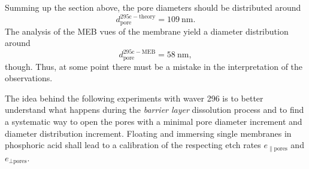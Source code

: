 \documentclass[thesis.tex]{subfiles}
\begin{document}
      Summing up the section above, the pore diameters should be distributed around
      \begin{equation}
          d_\mathrm{pore}^\mathrm{295c-theory} = \SI{109}{\nano\meter}.
      \end{equation}
      The analysis of the MEB vues of the membrane yield a diameter distribution around
      \begin{equation}
          d_\mathrm{pore}^\mathrm{295c-MEB} = \SI{58}{\nano\meter},
      \end{equation}
      though. Thus, at some point there must be a mistake in the interpretation of the observations.
      \medskip

      The idea behind the following experiments with waver 296 is to better understand what happens during the \textit{barrier layer} dissolution process and to find a systematic way to open the pores with a minimal pore diameter increment and diameter distribution increment. Floating and immersing single membranes in phosphoric acid shall lead to a calibration of the respecting etch rates $e_\mathrm{\parallel pores}$ and $e_\mathrm{\bot pores}$.
      \medskip
\end{document}
